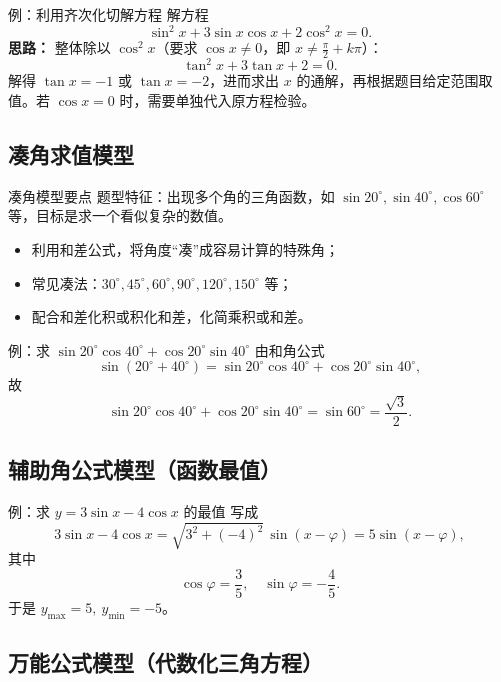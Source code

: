 \documentclass[a4paper,11pt]{ctexart}
\begin{document}
\begin{examplebox}{例：利用齐次化切解方程}
解方程
\[
\sin^2x + 3\sin x\cos x + 2\cos^2x = 0.
\]
\textbf{思路：} 整体除以 $\cos^2x$（要求 $\cos x\neq0$，即 $x\neq \frac{\pi}{2}+k\pi$）：
\[
\tan^2x + 3\tan x + 2 = 0.
\]
解得 $\tan x = -1$ 或 $\tan x = -2$，进而求出 $x$ 的通解，再根据题目给定范围取值。若 $\cos x=0$ 时，需要单独代入原方程检验。
\end{examplebox}

\subsection{凑角求值模型}

\begin{summarybox}{凑角模型要点}
题型特征：出现多个角的三角函数，如 $\sin20^\circ,\sin40^\circ,\cos60^\circ$ 等，目标是求一个看似复杂的数值。
\begin{itemize}
  \item 利用和差公式，将角度“凑”成容易计算的特殊角；
  \item 常见凑法：$30^\circ,45^\circ,60^\circ,90^\circ,120^\circ,150^\circ$ 等；
  \item 配合和差化积或积化和差，化简乘积或和差。
\end{itemize}
\end{summarybox}

\begin{examplebox}{例：求 $\sin20^\circ\cos40^\circ+\cos20^\circ\sin40^\circ$}
由和角公式
\[
\sin(20^\circ+40^\circ) = \sin20^\circ\cos40^\circ + \cos20^\circ\sin40^\circ,
\]
故
\[
\sin20^\circ\cos40^\circ+\cos20^\circ\sin40^\circ = \sin60^\circ = \frac{\sqrt{3}}{2}.
\]
\end{examplebox}

\subsection{辅助角公式模型（函数最值）}

\begin{examplebox}{例：求 $y=3\sin x-4\cos x$ 的最值}
写成
\[
3\sin x - 4\cos x = \sqrt{3^2+(-4)^2}\,\sin(x-\varphi)=5\sin(x-\varphi),
\]
其中
\[
\cos\varphi=\frac{3}{5},\quad \sin\varphi=-\frac{4}{5}.
\]
于是 $y_{\max}=5,\ y_{\min}=-5$。
\end{examplebox}

\subsection{万能公式模型（代数化三角方程）}
\end{document}
